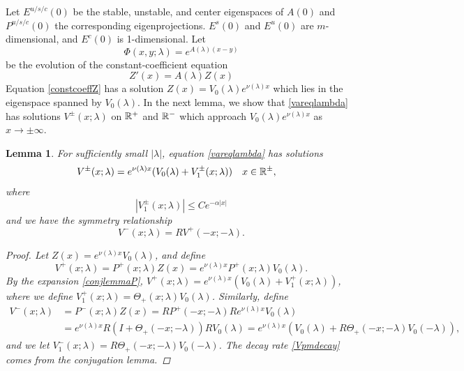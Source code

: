 \documentclass[10pt,reqno]{amsart}
\theoremstyle{plain}
\newtheorem{lemma}[theorem]{Lemma}
\theoremstyle{definition}
\theoremstyle{remark}
\numberwithin{theorem}{section}
\numberwithin{equation}{section}
\begin{document}
Let $E^{u/s/c}(0)$ be the stable, unstable, and center eigenspaces of $A(0)$ and $P^{u/s/c}(0)$ the corresponding eigenprojections. $E^s(0)$ and $E^u(0)$ are $m$-dimensional, and $E^c(0)$ is 1-dimensional. Let
\begin{equation}\label{defPhi}
\Phi(x, y; \lambda) = e^{A(\lambda)(x-y)}
\end{equation}
be the evolution of the constant-coefficient equation
\begin{equation}\label{constcoeffZ}
Z'(x) = A(\lambda) Z(x)
\end{equation}
Equation \cref{constcoeffZ} has a solution $Z(x) = V_0(\lambda)e^{\nu(\lambda)x}$ which lies in the eigenspace spanned by $V_0(\lambda)$. In the next lemma, we show that \cref{vareqlambda} has solutions $V^\pm(x; \lambda)$ on $\mathbb{R}^+$ and $\mathbb{R}^-$ which approach $V_0(\lambda)e^{\nu(\lambda)x}$ as $x \rightarrow \pm \infty$. 

\begin{lemma}\label{lemma:Vpm}
For sufficiently small $|\lambda|$, equation \cref{vareqlambda} has solutions
\begin{align}\label{Vpmlambda}
V^\pm(x; \lambda) &= e^{\nu(\lambda)x}(V_0(\lambda) + V_1^\pm(x; \lambda)) && x \in \mathbb{R}^\pm,
\end{align}
where
\begin{equation}\label{Vpmdecay}
|V_1^\pm(x; \lambda)| \leq C e^{-\alpha |x|}
\end{equation}
and we have the symmetry relationship
\begin{equation}\label{Vpmsymmetry}
V^-(x; \lambda) = R V^+(-x; -\lambda).
\end{equation}
\begin{proof}
Let $Z(x) = e^{\nu(\lambda)x}V_0(\lambda)$, and define
\begin{equation}\label{defVplus}
V^+(x; \lambda) = P^+(x; \lambda) Z(x) = e^{\nu(\lambda)x}P^+(x; \lambda)V_0(\lambda).
\end{equation}
By the expansion \eqref{conjlemmaP}, $V^+(x; \lambda) = e^{\nu(\lambda)x}( V_0(\lambda) + V_1^+(x; \lambda))$, where we define $V_1^+(x; \lambda) = \Theta_+(x; \lambda) V_0(\lambda)$. Similarly, define 
\begin{align*}
V^-(x; \lambda) &= P^-(x; \lambda) Z(x) = RP^+(-x; -\lambda)R e^{\nu(\lambda)x} V_0(\lambda) \\
&= e^{\nu(\lambda)x} R(I + \Theta_+(-x; -\lambda))R V_0(\lambda) = e^{\nu(\lambda)x}( V_0(\lambda) + R\Theta_+(-x; -\lambda) V_0(-\lambda) ),
\end{align*}
and we let $V_1^-(x; \lambda) = R\Theta_+(-x; -\lambda) V_0(-\lambda)$. The decay rate \cref{Vpmdecay} comes from the conjugation lemma.
\end{proof}
\end{lemma}
\end{document}

